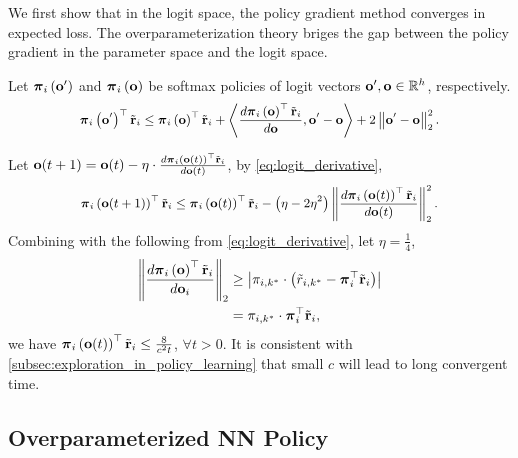We first show that in the logit space, the policy gradient method converges in expected loss. The overparameterization theory briges the gap between the policy gradient in the parameter space and the logit space.

\begin{lem}
\label{lem:logit_smoothness}
Let ${\boldsymbol{\pi}}_i\left( {\mathbf{o}}^\prime \right)$ and ${\boldsymbol{\pi}}_i\left( {\mathbf{o}} \right)$ be softmax policies of logit vectors ${\mathbf{o}}^\prime, {\mathbf{o}} \in {\mathbb{R}}^h$, respectively.
\begin{equation*}
\small
    \rvpi_i\left( \rvo^\prime \right)^\top \rvtilder_i \le \rvpi_i\left( \rvo \right)^\top \rvtilder_i + \left\langle \frac{d \rvpi_i\left( \rvo \right)^\top \rvtilder_i}{d \rvo}, \rvo^\prime - \rvo \right\rangle + 2 \left\| \rvo^\prime - \rvo \right\|_2^2.
\end{equation*}
\end{lem}
Let ${\mathbf{o}}(t+1) = {\mathbf{o}}(t) - \eta \cdot \frac{d {\boldsymbol{\pi}}_i\left( {\mathbf{o}}(t) \right)^\top {\tilde{\mathbf{r}}}_i}{d {\mathbf{o}}(t)}$, by \cref{eq:logit_derivative},
\begin{equation*}
\begin{split}
\small
    \rvpi_i\left( \rvo(t+1) \right)^\top \rvtilder_i \le \rvpi_i\left( \rvo(t) \right)^\top \rvtilder_i - \left( \eta - 2 \eta^2 \right) \left\| \frac{d \rvpi_i\left( \rvo(t) \right)^\top \rvtilder_i}{d \rvo(t)} \right\|_2^2.
\end{split}
\end{equation*}
Combining with the following from \cref{eq:logit_derivative}, let $\eta = \frac{1}{4}$,
\begin{equation}
\label{eq:logit_derivative_lower_bound}
\begin{split}
    \left\| \frac{d {\boldsymbol{\pi}}_i\left( {\mathbf{o}} \right)^\top {\tilde{\mathbf{r}}}_i}{d {\mathbf{o}}_i} \right\|_2 &\ge \left| \pi_{i,k^*} \cdot \left( \tilde{r}_{i,k^*} - {\boldsymbol{\pi}}_i^\top {\tilde{\mathbf{r}}}_i \right) \right| \\
    &= \pi_{i,k^*} \cdot {\boldsymbol{\pi}}_i^\top {\tilde{\mathbf{r}}}_i,
\end{split}
\end{equation}
we have ${\boldsymbol{\pi}}_i\left( {\mathbf{o}}(t) \right)^\top {\tilde{\mathbf{r}}}_i \le \frac{8}{c^2 t}$, $\forall t > 0$. It is consistent with \cref{subsec:exploration_in_policy_learning} that small $c$ will lead to long convergent time.

\subsection{Overparameterized NN Policy}
\label{subsec:overparameterized_nn_policy}

